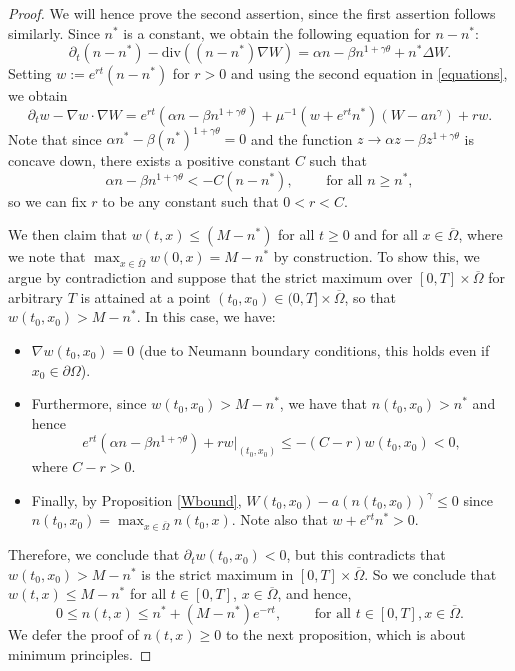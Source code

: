 \documentclass[12pt]{article}
\theoremstyle{plain}
\begin{document}
\begin{proof}
We will hence prove the second assertion, since the first assertion follows similarly. Since $n^{*}$ is a constant, we obtain the following equation for $n - n^{*}$:
\begin{equation*}
\partial_{t}(n - n^{*}) - \text{div}((n - n^{*})\nabla W) = \alpha n - \beta n^{1 + \gamma \theta} + n^{*}\Delta W.
\end{equation*}
Setting $w := e^{rt}(n - n^{*})$ for $r > 0$ and using the second equation in \eqref{equations}, we obtain
\begin{equation*}
\partial_{t}w - \nabla w \cdot \nabla W = e^{rt}(\alpha n - \beta n^{1 + \gamma \theta}) + \mu^{-1} (w + e^{rt}n^*)(W - an^{\gamma}) + rw.
\end{equation*}
Note that since $\alpha n^{*} - \beta (n^{*})^{1 + \gamma \theta} = 0$ and the function $z \to \alpha z - \beta z^{1 + \gamma \theta}$ is concave down, there exists a positive constant $C$ such that
\begin{equation*}
\alpha n - \beta n^{1 + \gamma \theta} < -C(n - n^{*}), \qquad \text{ for all } n \ge n^{*},
\end{equation*}
so we can fix $r$ to be any constant such that $0 < r < C$. 

We then claim that $w(t, x) \le (M - n^{*})$ for all $t \ge 0$ and for all $x \in \overline{\Omega}$, where we note that $\max_{x \in \overline{\Omega}} w(0, x) = M - n^{*}$ by construction. To show this, we argue by contradiction and suppose that the strict maximum over $[0, T] \times \overline{\Omega}$ for arbitrary $T$ is attained at a point $(t_0, x_0) \in (0, T] \times \overline{\Omega}$, so that $w(t_0, x_0) > M - n^{*}$. In this case, we have:
\begin{itemize}
    \item $\nabla w(t_0, x_0) = 0$ (due to Neumann boundary conditions, this holds even if $x_0 \in \partial \Omega$). 
    \item Furthermore, since $w(t_0, x_0) > M - n^{*}$, we have that $n(t_0, x_0) > n^{*}$ and hence
    \begin{equation*}
    e^{rt}(\alpha n - \beta n^{1 + \gamma \theta}) + rw|_{(t_0, x_0)} \le -(C - r) w(t_0, x_0) < 0,
    \end{equation*}
    where $C - r > 0$. 
    \item Finally, by Proposition \ref{Wbound}, $W(t_0, x_0) - a(n(t_0, x_0))^{\gamma} \le 0$ since $n(t_0, x_0) = \max_{x \in \overline{\Omega}} n(t_0, x)$. Note also that $w + e^{rt}n^{*} > 0$.
\end{itemize}
Therefore, we conclude that $\partial_{t}w(t_0, x_0) < 0$, but this contradicts that $w(t_0, x_0) > M - n^{*}$ is the strict maximum in $[0, T] \times \overline{\Omega}$. So we conclude that $w(t, x) \le M - n^{*}$ for all $t \in [0, T]$, $x \in \overline{\Omega}$, and hence,
\begin{equation*}
0 \le n(t, x) \le n^{*} + (M - n^{*}) e^{-rt}, \qquad \text{ for all } t \in [0, T], x \in \overline{\Omega}.
\end{equation*}
We defer the proof of $n(t, x) \ge 0$ to the next proposition, which is about minimum principles.
\end{proof}
\end{document}
